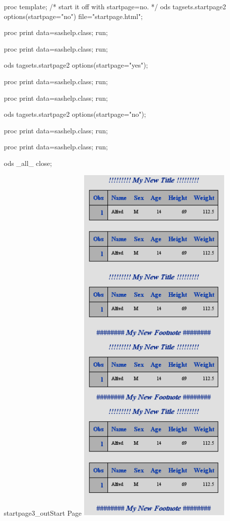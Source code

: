 \begin{sfvcode}
proc template;
/* start it off with startpage=no. */
ods tagsets.startpage2 options(startpage="no") file="startpage.html";

proc print data=sashelp.class; run;

proc print data=sashelp.class; run;

ods tagsets.startpage2 options(startpage="yes");

proc print data=sashelp.class; run;

proc print data=sashelp.class; run;

ods tagsets.startpage2 options(startpage="no");

proc print data=sashelp.class; run;

proc print data=sashelp.class; run;

ods _all_ close;
\end{sfvcode}

\begin{goutput}{startpage3_out}{Start Page }
\includegraphics[width=3in]{startpage3.png}
\end{goutput}

